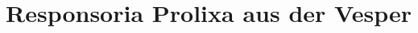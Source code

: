  \chapter{Responsoria Prolixa aus der Vesper}\def\gebet{\textsc{Responsoria Prolixa}}
\newpage
{}
\par
\begin{center}
{\centering{\scalebox{3}{\grecross}}}
\end{center}